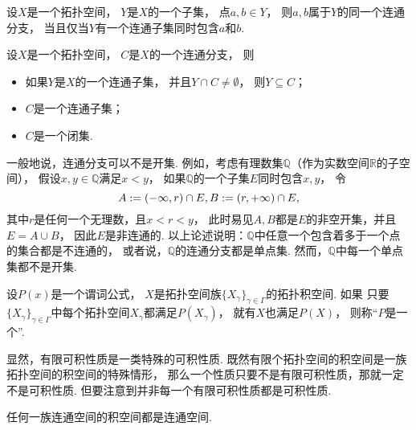 \begin{proposition}
设\(X\)是一个拓扑空间，
\(Y\)是\(X\)的一个子集，
点\(a,b \in Y\)，
则\(a,b\)属于\(Y\)的同一个连通分支，
当且仅当\(Y\)有一个连通子集同时包含\(a\)和\(b\).
\end{proposition}

\begin{theorem}
设\(X\)是一个拓扑空间，
\(C\)是\(X\)的一个连通分支，
则\begin{itemize}
	\item 如果\(Y\)是\(X\)的一个连通子集，
	并且\(Y \cap C \neq \emptyset\)，
	则\(Y \subseteq C\)；

	\item \(C\)是一个连通子集；

	\item \(C\)是一个闭集.
\end{itemize}
\end{theorem}

一般地说，连通分支可以不是开集.
例如，考虑有理数集\(\mathbb{Q}\)（作为实数空间\(\mathbb{R}\)的子空间），
假设\(x,y\in\mathbb{Q}\)满足\(x<y\)，
如果\(\mathbb{Q}\)的一个子集\(E\)同时包含\(x,y\)，
令\begin{equation*}
	A := (-\infty,r) \cap E,
	B := (r,+\infty) \cap E,
\end{equation*}
其中\(r\)是任何一个无理数，且\(x<r<y\)，
此时易见\(A,B\)都是\(E\)的非空开集，并且\(E = A \cup B\)，
因此\(E\)是非连通的.
以上论述说明：\(\mathbb{Q}\)中任意一个包含着多于一个点的集合都是不连通的，
或者说，\(\mathbb{Q}\)的连通分支都是单点集.
然而，\(\mathbb{Q}\)中每一个单点集都不是开集.

\begin{definition}
设\(P(x)\)是一个谓词公式，
\(X\)是拓扑空间族\(\{X_\gamma\}_{\gamma \in \Gamma}\)的拓扑积空间.
如果
	只要\(\{X_\gamma\}_{\gamma \in \Gamma}\)中每个拓扑空间\(X_\gamma\)都满足\(P(X_\gamma)\)，
	就有\(X\)也满足\(P(X)\)，
则称“\(P\)是一个”.
\end{definition}
显然，有限可积性质是一类特殊的可积性质.
既然有限个拓扑空间的积空间是一族拓扑空间的积空间的特殊情形，
那么一个性质只要不是有限可积性质，那就一定不是可积性质.
但要注意到并非每一个有限可积性质都是可积性质.

\begin{theorem}
任何一族连通空间的积空间都是连通空间.
\end{theorem}
